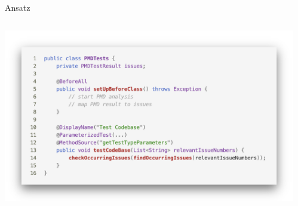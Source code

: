 \documentclass{sdqbeamer}
\begin{document}
\begin{frame}[fragile]{Ansatz}
    \begin{columns}
\begin{column}{0.7\textwidth}
\hspace{-0.5cm}
\vspace{-0.3cm}
\includegraphics[scale=0.23]{logos/PMDTestCase.png}


\end{column}
\begin{column}{0.3\textwidth}  %
    \begin{center}
    \hspace{-1cm}
     
     \end{center}
\end{column}
\end{columns}
    
\end{frame}
\end{document}
